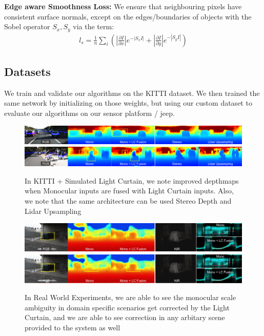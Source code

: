 \textbf{Edge aware Smoothness Loss:} We ensure that neighbouring pixels have consistent surface normals, except on the edges/boundaries of objects with the Sobel operator $S_{x}, S_{y}$ via the term:
\small
\begin{align}
   l_{s}=\frac{1}{n}\sum_{i}\left(\left|\frac{\partial I}{\partial x}\right|e^{-|S_{x}I|}+\left|\frac{\partial I}{\partial y}\right|e^{-|S_{y}I|}\right)
  \label{eq:smooth} 
\end{align}
\normalsize

\subsection{Datasets}

We train and validate our algorithms on the KITTI dataset. We then trained the same network by initializing on those weights, but using our custom dataset to evaluate our algorithms on our sensor platform / jeep.

\begin{figure}[h!]
  \includegraphics[width=1.0\textwidth]{figures/p1.png}
  \includegraphics[width=1.0\textwidth]{figures/p2.png}
  \caption{In KITTI + Simulated Light Curtain, we note improved depthmaps when Monocular inputs are fused with Light Curtain inputs. Also, we note that the same architecture can be used Stereo Depth and Lidar Upsampling}  
  \label{fig:images2} 
\end{figure}

\begin{figure}[h!]
  \includegraphics[width=1.0\textwidth]{figures/p4.png}
  \includegraphics[width=1.0\textwidth]{figures/p5.png}
  \caption{In Real World Experiments, we are able to see the monocular scale ambiguity in domain specific scenarios get corrected by the Light Curtain, and we are able to see correction in any arbitary scene provided to the system as well}  
  \label{fig:images3} 
\end{figure}

